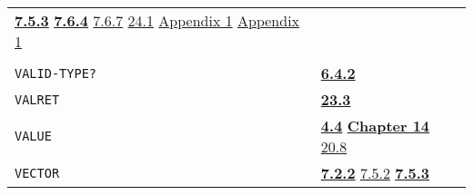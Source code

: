 \documentclass[a4paper,]{article}
\begin{document}
\begin{longtable}[]{@{}ll@{}}
\begin{minipage}[t]{0.70\columnwidth}
\textbf{\href{07-structured-objects.md\#753-list-vector-uvector-and-string-the-subrs-1}{7.5.3}}
\textbf{\href{07-structured-objects.md\#764-vector-the-primtype-1}{7.6.4}}
\href{07-structured-objects.md\#767-bytes}{7.6.7} \href{24-efficiency-and-tastefulness.md\#241-efficiency}{24.1}
\href{appendix-1-a-look-inside.md\#appendix-1-a-look-inside}{Appendix 1}
\href{appendix-1-a-look-inside.md\#basic-data-structures}{Appendix 1}\strut
\end{minipage}\tabularnewline
\begin{minipage}[t]{0.24\columnwidth}\raggedright\strut
\strut
\end{minipage} & \begin{minipage}[t]{0.70\columnwidth}\raggedright\strut
\strut
\end{minipage}\tabularnewline
\begin{minipage}[t]{0.24\columnwidth}\raggedright\strut
\texttt{VALID-TYPE?}\strut
\end{minipage} & \begin{minipage}[t]{0.70\columnwidth}\raggedright\strut
\textbf{\href{06-data-types.md\#642-valid-type}{6.4.2}}\strut
\end{minipage}\tabularnewline
\begin{minipage}[t]{0.24\columnwidth}\raggedright\strut
\texttt{VALRET}\strut
\end{minipage} & \begin{minipage}[t]{0.70\columnwidth}\raggedright\strut
\textbf{\href{23-mdl-as-a-system-process.md\#233-exits}{23.3}}\strut
\end{minipage}\tabularnewline
\begin{minipage}[t]{0.24\columnwidth}\raggedright\strut
\texttt{VALUE}\strut
\end{minipage} & \begin{minipage}[t]{0.70\columnwidth}\raggedright\strut
\textbf{\href{04-values-of-atoms.md\#44-value}{4.4}}
\textbf{\href{14-data-type-declarations.md\#chapter-14-data-type-declarations}{Chapter 14}}
\href{20-coroutines.md\#208-sneakiness-with-processes}{20.8}\strut
\end{minipage}\tabularnewline
\begin{minipage}[t]{0.24\columnwidth}\raggedright\strut
\texttt{VECTOR}\strut
\end{minipage} & \begin{minipage}[t]{0.70\columnwidth}\raggedright\strut
\textbf{\href{07-structured-objects.md\#722-vector-1}{7.2.2}} \href{07-structured-objects.md\#752-quote-1}{7.5.2}
\textbf{\href{07-structured-objects.md\#753-list-vector-uvector-and-string-the-subrs-1}{7.5.3}}

\end{minipage}
\end{longtable}
\end{document}
